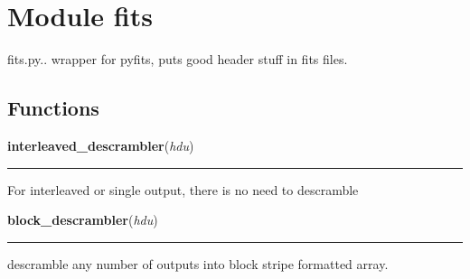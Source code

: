 %
%
%


\section{Module fits}

    \label{fits}
fits.py.. wrapper for pyfits, puts good header stuff in fits files.



  \subsection{Functions}

    \label{fits:interleaved_descrambler}

    \vspace{0.5ex}

    \begin{boxedminipage}{\textwidth}

    \raggedright \textbf{interleaved\_descrambler}(\textit{hdu})

    \vspace{-1.5ex}

    \rule{\textwidth}{0.5\fboxrule}
    For interleaved or single output, there is no need to descramble

    \vspace{1ex}

    \end{boxedminipage}

    \label{fits:block_descrambler}

    \vspace{0.5ex}

    \begin{boxedminipage}{\textwidth}

    \raggedright \textbf{block\_descrambler}(\textit{hdu})

    \vspace{-1.5ex}

    \rule{\textwidth}{0.5\fboxrule}
    descramble any number of outputs into block stripe formatted array.

    \vspace{1ex}

    \end{boxedminipage}

